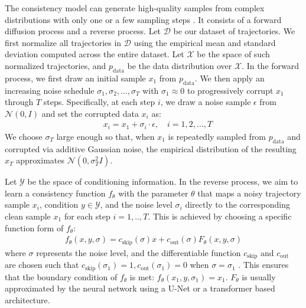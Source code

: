 The consistency model can generate high-quality samples from complex distributions with only one or a few sampling steps \citep{song2023consistency}.
It consists of a forward diffusion process and a reverse process.
Let $\mathcal{D}$ be our dataset of trajectories. 
We first normalize all trajectories in $\mathcal{D}$ using the empirical mean and standard deviation computed across the entire dataset. 
Let $\mathcal{X}$ be the space of such normalized trajectories, and $p_{\text{data}}$ be the data distribution over $\mathcal{X}$. 
In the forward process, we first draw an initial sample $x_1$ from $p_{\text{data}}$.
We then apply an increasing noise schedule ${\sigma_1, \sigma_2, ..., \sigma_T}$ with $\sigma_1 \approx 0$ to progressively corrupt $x_1$ through $T$ steps.
Specifically, at each step $i$, we draw a noise sample $\epsilon$ from $\mathcal{N}(0, I)$ and set the corrupted data $x_i$ as:
\begin{align}
\quad x_i = x_1 + \sigma_i \cdot \epsilon, \quad i=1,2,...,T
\end{align}
We choose $\sigma_T$ large enough so that, when $x_1$ is repeatedly sampled from $p_{\text{data}}$ and corrupted via additive Gaussian noise, the empirical distribution of the resulting $x_T$ approximates $\mathcal{N}(0, \sigma_T^2 I)$.

Let $\mathcal{Y}$ be the space of conditioning information.
In the reverse process, we aim to learn a consistency function $f_{\theta}$ with the parameter $\theta$ that maps a noisy trajectory sample $x_i$, condition $y \in \mathcal{Y}$, and the noise level $\sigma_i$ directly to the corresponding clean sample $x_1$ for each step $i=1,..,T$.
This is achieved by choosing a specific function form of $f_\theta$:
\begin{align}
    f_\theta(x, y, \sigma) = c_{\text{skip}}(\sigma) x + c_{\text{out}}(\sigma) F_\theta(x, y, \sigma)
\end{align}
where $\sigma$ represents the noise level, and the differentiable function $c_{\text{skip}}$ and $c_{\text{out}}$ are chosen such that $c_{\text{skip}}(\sigma_1)=1, c_{\text{out}}(\sigma_1)=0$ when $\sigma = \sigma_1$ \citep{karras2022elucidating}.
This ensures that the boundary condition of $f_\theta$ is met: $f_{\theta}(x_1, y, \sigma_1) = x_1$.
$F_{\theta}$ is usually approximated by the neural network using a U-Net \citep{ronneberger2015u} or a transformer \citep{peebles2023scalable} based architecture.

